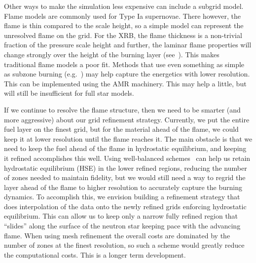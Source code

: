 \documentclass[a4paper]{jpconf}
\begin{document}
Other ways to make the simulation less expensive can include a subgrid
model. Flame models are commonly used for Type Ia supernovae.  There
however, the flame is thin compared to the scale height, so a simple
model can represent the unresolved flame on the grid.  For the XRB,
the flame thickness is a non-trivial fraction of the pressure scale
height and further, the laminar flame properties will change strongly
over the height of the burning layer (see~\cite{Timmes00}).  This
makes traditional flame models a poor fit.  Methods that use even
something as simple as subzone burning (e.g.~\cite{Wang2012190}) may
help capture the energetics with lower resolution.  This can be
implemented using the AMR machinery.  This may help a little, but will
still be insufficient for full star models.

If we continue to resolve the flame structure, then we need to be
smarter (and more aggressive) about our grid refinement strategy.
Currently, we put the entire fuel layer on the finest grid, but for
the material ahead of the flame, we could keep it at lower resolution
until the flame reaches it.  The main obstacle is that we need to keep
the fuel ahead of the flame in hydrostatic equilibrium, and keeping it
refined accomplishes this well.  Using well-balanced
schemes~\cite{kappeli:2016} can help us retain hydrostatic equilibrium
(HSE) in the lower refined regions, reducing the number of zones
needed to maintain fidelity, but we would still need a way to regrid
the layer ahead of the flame to higher resolution to accurately
capture the burning dynamics.  To accomplish this, we envision
building a refinement strategy that does interpolation of the data onto
the newly refined grids enforcing hydrostatic equilibrium.  This can
allow us to keep only a narrow fully refined region that ``slides''
along the surface of the neutron star keeping pace with the advancing
flame.  When using mesh refinement the overall costs are dominated by the
number of zones at the finest resolution, so such a scheme would greatly reduce
the computational costs. This is a longer term development.
\end{document}
